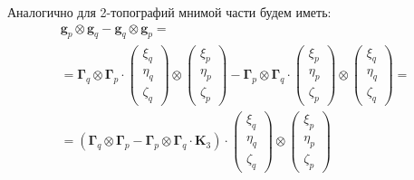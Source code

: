 Аналогично для 2-топографий мнимой части будем иметь:
\begin{multline}
    \mathbf{g}_p \otimes \mathbf{g}_q - \mathbf{g}_q \otimes \mathbf{g}_p = \\
    =
    \mathbf{\Gamma}_q
    \otimes
    \mathbf{\Gamma}_p
    \cdot
    \left(\begin{array}{ccc}
            \xi_q\\
            \eta_q\\
            \zeta_q
        \end{array}
    \right)
    \otimes
    \left(\begin{array}{ccc}
            \xi_p\\
            \eta_p\\
            \zeta_p
        \end{array}
    \right) -
    \mathbf{\Gamma}_p
    \otimes
    \mathbf{\Gamma}_q
    \cdot
    \left(\begin{array}{ccc}
            \xi_p\\
            \eta_p\\
            \zeta_p
        \end{array}
    \right)
    \otimes
    \left(\begin{array}{ccc}
            \xi_q\\
            \eta_q\\
            \zeta_q
        \end{array}
    \right) = \\
    =  \left(
        \mathbf{\Gamma}_q
    \otimes
    \mathbf{\Gamma}_p
  -
  \mathbf{\Gamma}_p
    \otimes
    \mathbf{\Gamma}_q
    \cdot
    \mathbf{K}_3
    \right)
    \cdot
    \left(\begin{array}{ccc}
            \xi_q\\
            \eta_q\\
            \zeta_q
        \end{array}
    \right)
    \otimes
    \left(\begin{array}{ccc}
            \xi_p\\
            \eta_p\\
            \zeta_p
        \end{array}
    \right)
\end{multline}

